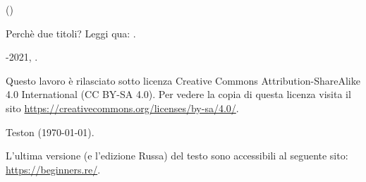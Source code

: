 ﻿\begin{titlepage}


\end{titlepage}

\newpage

\begin{center}
\vspace*{\fill}
{\LARGE \TitleMain}

\bigskip

{\large (\TitleAux)}

\bigskip
\bigskip
Perchè due titoli? Leggi qua: .

\vspace*{\fill}

{\large \AUTHOR}

{\large \TT{\EMAILPRI}}
\vspace*{\fill}
\vfill

\ccbysa

-2021, \AUTHOR.

Questo lavoro è rilasciato sotto licenza Creative Commons Attribution-ShareAlike 4.0 International (CC BY-SA 4.0).
Per vedere la copia di questa licenza visita il sito \url{https://creativecommons.org/licenses/by-sa/4.0/}.

Teston ({\large \today}).

L'ultima versione (e l'edizione Russa) del testo sono accessibili al seguente sito: \url{https://beginners.re/}.

\end{center}
